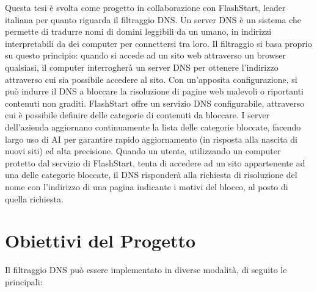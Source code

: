 \documentclass[12pt,a4paper,openright,twoside]{book}
\begin{document}
Questa tesi è svolta come progetto in collaborazione con FlashStart, leader italiana per quanto riguarda il filtraggio \gls{DNS}.
Un server \gls{DNS} è un sistema che permette di tradurre nomi di domini leggibili da un umano, in indirizzi interpretabili da dei computer per connettersi tra loro.
Il filtraggio si basa proprio su questo principio: quando si accede ad un sito web attraverso un browser qualsiasi, il computer interrogherà un server \gls{DNS} per ottenere l'indirizzo attraverso cui sia possibile accedere al sito.
Con un'apposita configurazione, si può indurre il \gls{DNS} a bloccare la risoluzione di pagine web malevoli o riportanti contenuti non graditi.
FlashStart offre un servizio \gls{DNS} configurabile, attraverso cui è possibile definire delle categorie di contenuti da bloccare.
I server dell'azienda aggiornano continuamente la lista delle categorie bloccate, facendo largo uso di \gls{AI} per garantire rapido aggiornamento (in risposta alla nascita di nuovi siti) ed alta precisione.
Quando un utente, utilizzando un computer protetto dal servizio di FlashStart, tenta di accedere ad un sito appartenente ad una delle categorie bloccate, il \gls{DNS} risponderà alla richiesta di risoluzione del nome con l'indirizzo di una pagina indicante i motivi del blocco, al posto di quella richiesta.

\section{Obiettivi del Progetto}
\label{sec:obiettivi-progetto}

Il filtraggio \gls{DNS} può essere implementato in diverse modalità, di seguito le principali:
\end{document}
